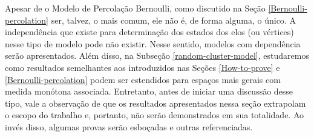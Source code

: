 \par Apesar de o Modelo de Percolação Bernoulli, como discutido na Seção \ref{Bernoulli-percolation} ser, talvez, o mais comum, ele não é, de forma alguma, o único. A independência que existe para determinação dos estados dos elos (ou vértices) nesse tipo de modelo pode não existir. Nesse sentido, modelos com dependência serão apresentados. Além disso, na Subseção \ref{random-cluster-model}, estudaremos como resultados semelhantes aos introduzidos nas Seções \ref{How-to-prove} e \ref{Bernoulli-percolation} podem ser estendidos para espaços mais gerais com medida monótona associada. Entretanto, antes de iniciar uma discussão desse tipo, vale a observação de que os resultados apresentados nessa seção extrapolam o escopo do trabalho e, portanto, não serão demonstrados em sua totalidade. Ao invés disso, algumas provas serão esboçadas e outras referenciadas.